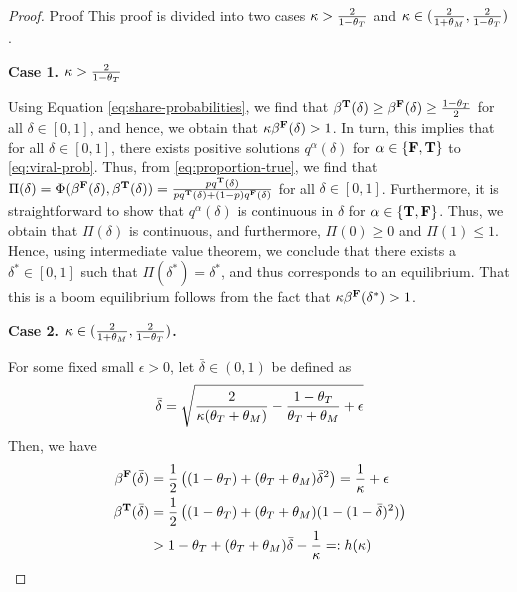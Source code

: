 \begin{proof}{Proof}
This proof is divided into two cases $\kappa > \frac{2}{1-\tt}$ and $\kappa \in (\frac{2}{1+\tm}, \frac{2}{1-\tt})$. 

\noindent\textbf{Case 1.} $\kappa > \frac{2}{1-\tt}$ 

Using Equation \eqref{eq:share-probabilities}, we find that $\beta^\true(\delta) \geq \beta^\false(\delta) \geq \frac{1-\tt}{2}$ for all $\delta \in [0,1]$, and hence, we obtain that $\kappa \beta^\false(\delta) > 1$. In turn, this implies that for all $\delta \in [0,1]$, there exists positive solutions $q^\alpha(\delta)$ for $\alpha \in \{ \false, \true\}$ to \eqref{eq:viral-prob}.  Thus, from \eqref{eq:proportion-true}, we find that $\Pi(\delta) = \Phi(\beta^\false(\delta), \beta^\true(\delta)) = \frac{p q^\true(\delta) }{p q^\true(\delta) + (1-p)q^\false(\delta)}$ for all $\delta \in [0,1]$. Furthermore, it is straightforward to show that $q^\alpha(\delta)$ is continuous in $\delta$ for $\alpha \in \{\true, \false\}$. Thus, we obtain that $\Pi(\delta)$ is continuous, and furthermore, $\Pi(0) \geq 0$ and $\Pi(1) \leq 1$. Hence, using intermediate value theorem, we conclude that there exists a $\delta^* \in [0,1]$ such that $\Pi(\delta^*) = \delta^*$, and thus corresponds to an equilibrium. That this is a boom equilibrium follows from the fact that $\kappa \beta^\false(\delta^*) >1$.

\noindent \textbf{Case 2. $\kappa \in (\frac{2}{1+\tm}, \frac{2}{1-\tt})$.}


For some fixed small $\epsilon > 0$, let $\bar{\delta} \in (0,1)$ be defined as 
\begin{align*}
    \bar{\delta} =  \sqrt{ \frac{2}{\kappa (\tt + \tm)} - \frac{1-\tt}{\tt+\tm} + \epsilon}
\end{align*}
Then, we have
\begin{align*}
    \beta^\false(\bar{\delta}) &= \frac{1}{2} \left((1-\tt) + (\tt + \tm ) \bar{\delta}^2 \right) = \frac{1}{\kappa} + \epsilon \\
    \beta^\true(\bar{\delta}) &=  \frac{1}{2} \left((1-\tt) + (\tt + \tm ) (1 - (1-\bar{\delta})^2) \right) \\
    &> 1 - \tt + (\tt + \tm ) \bar{\delta} - \frac{1}{\kappa} \eqdef h(\kappa) 
\end{align*}


\end{proof}
